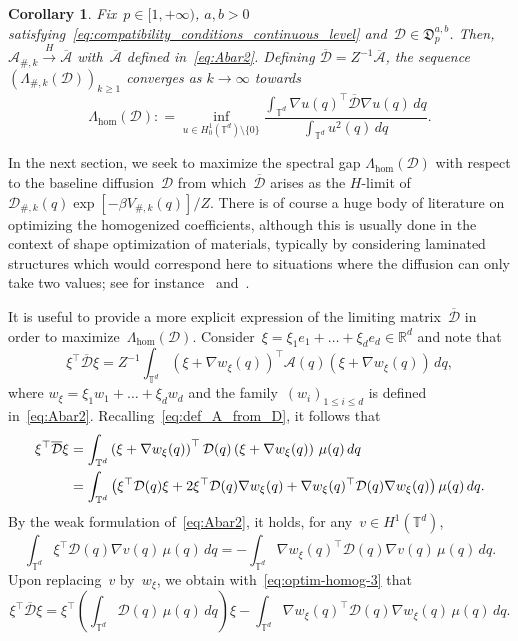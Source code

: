 \documentclass{article}
\newtheorem{corollary}{Corollary}
\newcommand{\dps}{\displaystyle }
\newcommand{\R}{\mathbb{R}}
\renewcommand{\leq}{\leqslant}
\renewcommand{\geq}{\geqslant}
\def\R{\mathbb{R}}
\def\T{\mathbb{T}}
\newcommand{\A}{\mathcal{A}}
\newcommand{\Diff}{\mathcal{D}}
\newcommand{\Diffset}{\mathfrak{D}}
\renewcommand{\dim}{d}
\begin{document}
\begin{corollary}
  \label{cor:Hcvg-spectral}
  Fix~$p \in [1,+\infty)$, $a,b>0$ satisfying~\eqref{eq:compatibility_conditions_continuous_level} and~$\Diff\in \Diffset_p^{a,b}$. Then, $\mathcal{A}_{\#,k} \xrightarrow{H} \overline{\mathcal{A}}$ with~$\overline{\A}$ defined in~\eqref{eq:Abar2}. Defining $\overline{\Diff} = Z^{-1}\overline{\A}$, the sequence $\left(\Lambda_{\#,k}(\Diff)\right)_{k\geq 1}$ converges as $k\to \infty$ towards 
  \[
  \Lambda_{\mathrm{hom}}(\Diff) : = \inf_{u\in H^1_0(\T^\dim) \setminus\{0\}}\frac{\dps \int_{\T^\dim} \nabla u(q)^\top \overline{\Diff}\nabla u(q) \, dq}{\dps \int_{\T^\dim}u^2(q) \, dq}.
  \]
\end{corollary}

In the next section, we seek to maximize the spectral gap $\Lambda_{\mathrm{hom}}(\Diff)$ with respect to the baseline diffusion~$\Diff$ from which~$\overline{\Diff}$ arises as the $H$-limit of~$\Diff_{\#,k}(q)\exp[-\beta V_{\#,k}(q)]/Z$. There is of course a huge body of literature on optimizing the homogenized coefficients, although this is usually done in the context of shape optimization of materials, typically by considering laminated structures which would correspond here to situations where the diffusion can only take two values; see for instance~\cite{Sigmund94,HD95,BT10,AGDP19} and~\cite[Chapter~10]{Henrot}.

It is useful to provide a more explicit expression of the limiting matrix~$\overline{\Diff}$ in order to maximize~$\Lambda_{\mathrm{hom}}(\Diff)$. Consider~$\xi = \xi_1e_1 + \dots + \xi_\dim e_\dim \in\R^\dim$ and note that
\[
\xi^{\top} \overline{\Diff}\xi = Z^{-1} \int_{\T^\dim} (\xi + \nabla w_{\xi}(q))^\top \A(q)(\xi + \nabla w_{\xi}(q)) \, dq,
\]
where $w_{\xi} = \xi_1 w_1 + \dots + \xi_\dim w_\dim$ and the family~$(w_i)_{1 \leq i \leq \dim}$ is defined in~\eqref{eq:Abar2}. Recalling~\eqref{eq:def_A_from_D}, it follows that
\begin{align}
  \xi^{\top} \overline{\Diff}\xi & = \int_{\T^\dim} \left(\xi+\nabla w_\xi(q)\right)^{\top} \Diff(q) \left(\xi+\nabla w_\xi(q)\right) \, \mu(q) \, dq \notag \\
  & = \int_{\T^\dim}\left(\xi^{\top} \Diff(q)\xi  + 2 \xi^{\top}\Diff(q)\nabla w_\xi(q)+ \nabla w_\xi(q)^{\top} \Diff(q) \nabla w_\xi(q) \right)\mu(q) \, dq. \label{eq:optim-homog-3}
\end{align}
By the weak formulation of~\eqref{eq:Abar2}, it holds, for any~$v \in H^1(\T^\dim)$,
\begin{equation}
  \label{eq:FV_def_mat_homog}
  \int_{\T^\dim}\xi^{\top} \Diff(q)\nabla v(q) \, \mu(q) \, dq = -\int_{\T^\dim}\nabla w_\xi(q)^{\top} \Diff(q)\nabla v(q) \, \mu(q) \, dq.
\end{equation}
Upon replacing~$v$ by~$w_\xi$, we obtain with~\eqref{eq:optim-homog-3} that
\begin{equation}
  \label{eq:optim-homog-4}
  \xi^{\top} \overline{\Diff}\xi  = \xi^\top \left( \int_{\T^\dim} \Diff(q)\, \mu(q)\, dq \right)\xi - \int_{\T^\dim}\nabla w_\xi(q)^{\top} \Diff(q) \nabla w_\xi(q) \, \mu(q) \, dq.
\end{equation}
\end{document}

